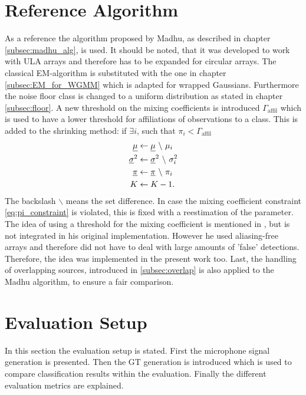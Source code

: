 \section{Reference Algorithm}
\label{sec:comp_alg}
As a reference the algorithm proposed by Madhu, as described in chapter \ref{subsec:madhu_alg}, is used. It should be noted, that it was developed to work with \ac{ULA} arrays and therefore has to be expanded for circular arrays. The classical \ac{EM}-algorithm is substituted with the one in chapter \ref{subsec:EM_for_WGMM} which is adapted for wrapped Gaussians. Furthermore the noise floor class is changed to a uniform distribution as stated in chapter \ref{subsec:floor}. A new threshold on the mixing coefficients is introduced $\Gamma_\text{affil}$ which is used to have a lower threshold for affiliations of observations to a class. This is added to the shrinking method:
if $\exists i$, such that $\pi_i < \Gamma_\text{affil}$
\begin{equation}
\begin{split}
\underline{\mu} &\leftarrow \underline{\mu}\  \backslash\ \mu_i \\
\underline{\sigma}^2 &\leftarrow \underline{\sigma}^2\ \backslash\ \sigma^2_i \\
\underline{\pi} &\leftarrow \underline{\pi}\ \backslash\ \pi_i \\
K &\leftarrow K-1.
\end{split}
\end{equation}
The backslash $\backslash$ means the set difference. In case the mixing coefficient constraint \ref{eq:pi_constraint} is violated, this is fixed with a reestimation of the parameter. The idea of using  a threshold for the mixing coefficient is mentioned in \cite{madhu2008scalable}, but is not integrated in his original implementation. However he used aliasing-free arrays and therefore did not have to deal with large amounts of 'false' detections. Therefore, the idea was implemented in the present work too. Last, the handling of overlapping sources, introduced in \ref{subsec:overlap} is also applied to the Madhu algorithm, to ensure a fair comparison.

\section{Evaluation Setup}
\label{sec:eval_setup}

In this section the evaluation setup is stated. First the microphone signal generation is presented. Then the \ac{GT} generation is introduced which is used to compare classification results within the evaluation. Finally the different evaluation metrics are explained.

